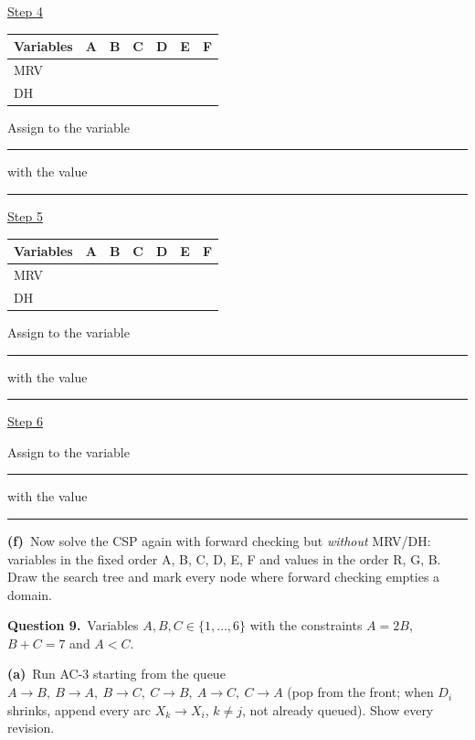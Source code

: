 \documentclass[11pt,a4paper]{article}
\newcommand{\question}[1]{\par\medskip\noindent\textbf{Question #1.}\ }
\newcommand{\subq}[1]{\par\smallskip\noindent\textbf{#1}\ }
\begin{document}
\underline{Step 4}\par\begin{center}\small \begin{tabular}{|l|c|c|c|c|c|c|}\hline Variables & \textbf{A} & \textbf{B} & \textbf{C} & \textbf{D} & \textbf{E} & \textbf{F}\\ \hline MRV & \phantom{0} & \phantom{0} & \phantom{0} & \phantom{0} & \phantom{0} & \phantom{0}\\[1mm]\hline DH & \phantom{0} & \phantom{0} & \phantom{0} & \phantom{0} & \phantom{0} & \phantom{0}\\[1mm]\hline\end{tabular}\end{center}Assign to the variable \rule{2.5cm}{0.3pt} with the value \rule{2.5cm}{0.3pt}\par
\underline{Step 5}\par\begin{center}\small \begin{tabular}{|l|c|c|c|c|c|c|}\hline Variables & \textbf{A} & \textbf{B} & \textbf{C} & \textbf{D} & \textbf{E} & \textbf{F}\\ \hline MRV & \phantom{0} & \phantom{0} & \phantom{0} & \phantom{0} & \phantom{0} & \phantom{0}\\[1mm]\hline DH & \phantom{0} & \phantom{0} & \phantom{0} & \phantom{0} & \phantom{0} & \phantom{0}\\[1mm]\hline\end{tabular}\end{center}Assign to the variable \rule{2.5cm}{0.3pt} with the value \rule{2.5cm}{0.3pt}\par
\underline{Step 6}\par Assign to the variable \rule{2.5cm}{0.3pt} with the value \rule{2.5cm}{0.3pt}\par
\subq{(f)}Now solve the CSP again with forward checking but \emph{without} MRV/DH: variables in the fixed order A, B, C, D, E, F and values in the order R, G, B. Draw the search tree and mark every node where forward checking empties a domain.
\begin{ansbox}[height=7.0cm]\end{ansbox}
\clearpage
\question{9}Variables $A,B,C\in\{1,\dots,6\}$ with the constraints $A=2B$, $B+C=7$ and $A<C$.
\subq{(a)}Run AC-3 starting from the queue $A\to B,\ B\to A,\ B\to C,\ C\to B,\ A\to C,\ C\to A$ (pop from the front; when $D_i$ shrinks, append every arc $X_k\to X_i$, $k\neq j$, not already queued). Show every revision.
\begin{ansbox}[height=5.0cm]\end{ansbox}
\end{document}
